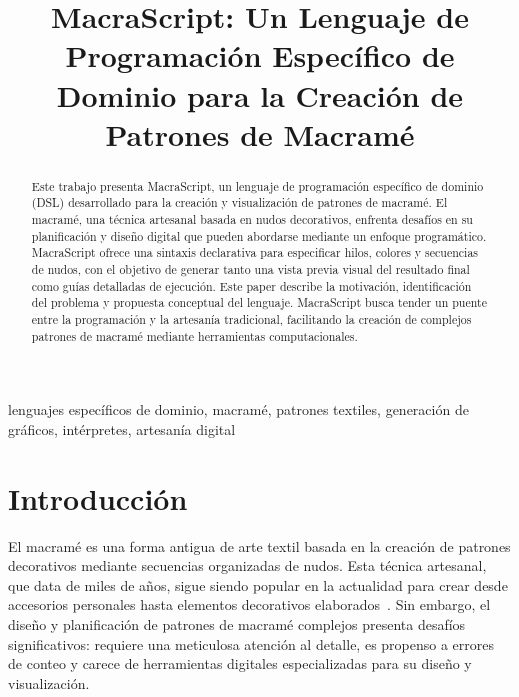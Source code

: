 \documentclass[conference]{IEEEtran}
\begin{document}
\title{MacraScript: Un Lenguaje de Programación Específico de Dominio para la Creación de Patrones de Macramé}

\author{
}

\maketitle

\begin{abstract}
Este trabajo presenta MacraScript, un lenguaje de programación específico de dominio (DSL) desarrollado para la creación y visualización de patrones de macramé. El macramé, una técnica artesanal basada en nudos decorativos, enfrenta desafíos en su planificación y diseño digital que pueden abordarse mediante un enfoque programático. MacraScript ofrece una sintaxis declarativa para especificar hilos, colores y secuencias de nudos, con el objetivo de generar tanto una vista previa visual del resultado final como guías detalladas de ejecución. Este paper describe la motivación, identificación del problema y propuesta conceptual del lenguaje. MacraScript busca tender un puente entre la programación y la artesanía tradicional, facilitando la creación de complejos patrones de macramé mediante herramientas computacionales.
\end{abstract}

\begin{IEEEkeywords}
lenguajes específicos de dominio, macramé, patrones textiles, generación de gráficos, intérpretes, artesanía digital
\end{IEEEkeywords}

\section{Introducción}
El macramé es una forma antigua de arte textil basada en la creación de patrones decorativos mediante secuencias organizadas de nudos. Esta técnica artesanal, que data de miles de años, sigue siendo popular en la actualidad para crear desde accesorios personales hasta elementos decorativos elaborados~\cite{karner2005}. Sin embargo, el diseño y planificación de patrones de macramé complejos presenta desafíos significativos: requiere una meticulosa atención al detalle, es propenso a errores de conteo y carece de herramientas digitales especializadas para su diseño y visualización.
\end{document}
